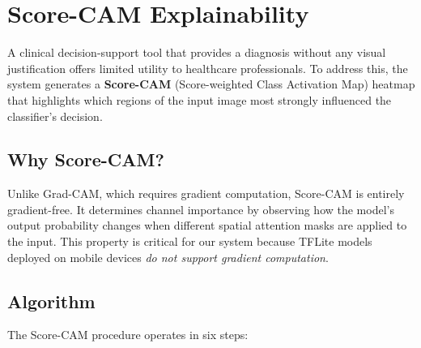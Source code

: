 \section{Score-CAM Explainability}
\label{sec:scorecam}

A clinical decision-support tool that provides a diagnosis without any visual justification offers limited utility to healthcare professionals. To address this, the system generates a \textbf{Score-CAM} (Score-weighted Class Activation Map) heatmap that highlights which regions of the input image most strongly influenced the classifier's decision.

\subsection{Why Score-CAM?}

Unlike Grad-CAM, which requires gradient computation, Score-CAM is entirely gradient-free. It determines channel importance by observing how the model's output probability changes when different spatial attention masks are applied to the input. This property is critical for our system because TFLite models deployed on mobile devices \textit{do not support gradient computation}.

\subsection{Algorithm}

The Score-CAM procedure operates in six steps:

